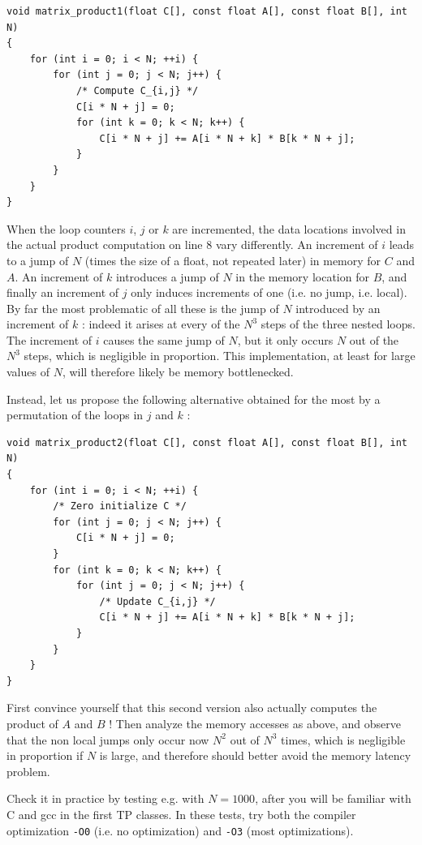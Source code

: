 \documentclass[12pt]{article}
\theoremstyle{plain}
\theoremstyle{remark}
\begin{document}
\begin{lstlisting}[style=C]
void matrix_product1(float C[], const float A[], const float B[], int N)
{
	for (int i = 0; i < N; ++i) {
		for (int j = 0; j < N; j++) {
			/* Compute C_{i,j} */
			C[i * N + j] = 0;
			for (int k = 0; k < N; k++) {
				C[i * N + j] += A[i * N + k] * B[k * N + j];
			}
		}
	}	
}
\end{lstlisting}

When the loop counters $i$, $j$ or $k$ are incremented, the data locations involved in the
actual product computation on line 8 vary differently. An increment of $i$ leads
to a jump of $N$ (times the size of a float, not repeated later) in memory for $C$ and $A$. An
increment of $k$ introduces a jump of $N$ in the memory location for $B$, and finally an
increment of $j$ only induces increments of one (i.e. no jump, i.e. local). 
By far the most problematic of all these is the jump of $N$ introduced by an
increment of $k$ : indeed it arises at every of the $N^3$ steps of the three
nested loops. The increment of $i$ causes the same jump of $N$, but it only
occurs $N$ out of the $N^3$ steps, which is negligible in proportion. This
implementation, at least for large values of $N$, will therefore likely 
be memory bottlenecked.

\medskip

Instead, let us propose the following alternative obtained for the most 
by a permutation of the loops in $j$ and $k$ :
\begin{lstlisting}[style=C]
void matrix_product2(float C[], const float A[], const float B[], int N)
{
	for (int i = 0; i < N; ++i) {
		/* Zero initialize C */
		for (int j = 0; j < N; j++) {
			C[i * N + j] = 0;
		}
		for (int k = 0; k < N; k++) {
			for (int j = 0; j < N; j++) {
				/* Update C_{i,j} */
				C[i * N + j] += A[i * N + k] * B[k * N + j];
			}
		}
	}	
}
\end{lstlisting}

 First convince yourself that this second version also
actually computes the product of $A$ and $B$ ! Then analyze the memory accesses
as above, and observe that the non local jumps only occur now $N^2$ out of $N^3$
times, which is negligible in proportion if $N$ is large, and therefore should 
better avoid the memory latency problem.

\medskip

 Check it in practice by testing e.g. with $N = 1000$, 
after you will be familiar with C and gcc in the first TP classes. 
In these tests, try both the compiler optimization {\tt -O0} (i.e. no
optimization) and {\tt -O3} (most optimizations).
\end{document}
